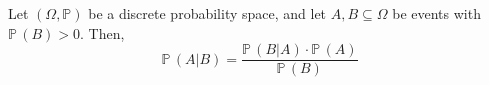 \documentclass[aspectratio=169]{beamer}
\begin{document}
\begin{wallpaperframe}
Let $(\Omega, \mathbb{P})$ be a discrete probability space, and let $A, B \subseteq \Omega$ be events with $\mathbb{P}\,(B) > 0$. Then,
\[
\mathbb{P}\,(A|B) = \frac{\mathbb{P}\,(B|A) \cdot \mathbb{P}\,(A)}{\mathbb{P}\,(B)}
\]
\end{wallpaperframe}
\end{document}
